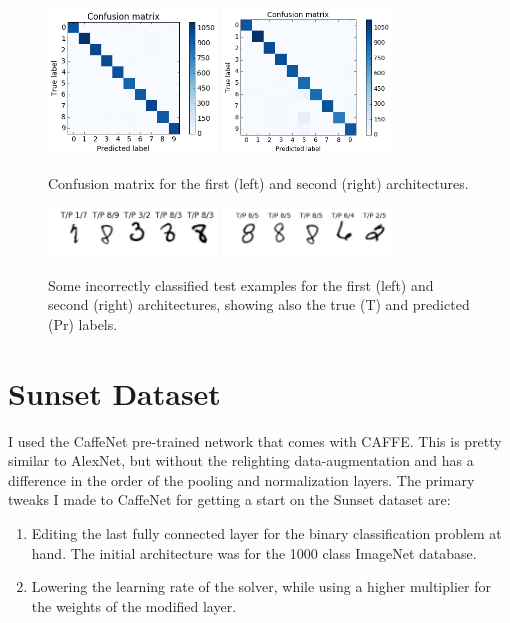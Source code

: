 \documentclass[5pt]{article}
\begin{document}
\begin{figure}[T]
  \centering{}
  \includegraphics[width=0.4\textwidth]{images/mnist_confusion1.png}
  \includegraphics[width=0.4\textwidth]{images/mnist_confusion2.png}
  \caption{Confusion matrix for the first (left) and second (right)
  architectures.}
\label{fig:mnist_confusion}
\end{figure}

\begin{figure}[h]
  \centering{}
  \includegraphics[width=0.4\textwidth]{images/mnist_incorrect1.png}
  \includegraphics[width=0.4\textwidth]{images/mnist_incorrect2.png}
  \caption{Some incorrectly classified test examples for the first (left)
  and second (right) architectures, showing also the true (T) and predicted
  (Pr) labels.}
\label{fig:mnist_incorrect}
\end{figure}

\section{Sunset Dataset}
I used the CaffeNet pre-trained network that comes with CAFFE\@. This is pretty
similar to AlexNet, but without the relighting data-augmentation and has a
difference in the order of the pooling and normalization layers. The primary
tweaks I made to CaffeNet for getting a start on the Sunset dataset are:
\begin{enumerate}
  \item Editing the last fully connected layer for the binary classification
    problem at hand. The initial architecture was for the 1000 class ImageNet
    database.
  \item Lowering the learning rate of the solver, while using a higher
    multiplier for the weights of the modified layer.
\end{enumerate}
\end{document}
